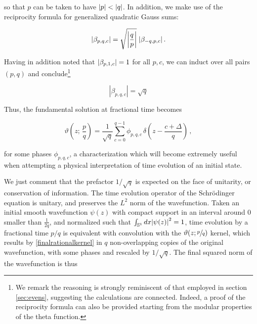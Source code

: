 \documentclass{article}
\newcommand{\cmnt}[1]{\textcolor{red}{\emph{#1}}}
\begin{document}
so that $p$ can be taken to have $\abs{p} < \abs{q}$. In addition, we make use of the reciprocity formula for generalized quadratic Gauss sums\cite{berndt_gauss}:

\begin{equation}
    \abs{\beta_{p,q,c}} = \sqrt{\abs{\frac{q}{p}}} \; \abs{\beta_{-q,p,c}}\,.
\end{equation}

Having in addition noted that $\abs{\beta_{p,1,c}} = 1$ for all $p,c$, we can induct over all pairs $(p,q)$ and conclude\footnote{We remark the reasoning is strongly reminiscent of that employed in section \ref{sec:evens}, suggesting the calculations are connected. Indeed, a proof of the reciprocity formula can also be provided starting from the modular properties of the theta function\cite{berndt_gauss}.}

\begin{equation}
    |\beta_{p,q,c}| = \sqrt{q}
\end{equation}

%
%


Thus, the fundamental solution at fractional time becomes

\begin{equation}\label{finalrationalkernel}
    \vartheta\left( z ; \,\frac{p}{q} \right) = \frac{1}{\sqrt{q}} \sum_{c=0}^{q-1} \phi_{p,q,c} \, \delta \left(z-\frac{c+\Delta}{q}\right)\,,
\end{equation}

for some phases $\phi_{p,q,c}$, a characterization which will become extremely useful when attempting a physical interpretation of time evolution of an initial state.

We just comment that the prefactor $1/\sqrt{q}$ is expected on the face of unitarity, or conservation of information. The time evolution operator of the Schr\"odinger equation is unitary, and preserves the $L^2$ norm of the wavefunction. Taken an initial smooth wavefunction $\psi(z)$ with compact support in an interval around $0$ smaller than $\frac{1}{2q}$, and normalized such that $\int_{\mathbb{S}^1} dx \abs{\psi(z)}^2 = 1$, time evolution by a fractional time $p/q$ is equivalent with convolution with the $\vartheta(z;\sfrac{p}{q})$ kernel, which results by \eqref{finalrationalkernel} in $q$ non-overlapping copies of the original wavefunction, with some phases and rescaled by $1/\sqrt{q}$. The final squared norm of the wavefunction is thus
\end{document}
